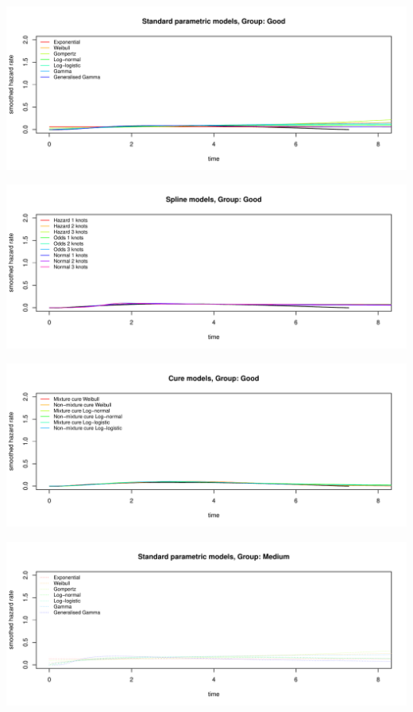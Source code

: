 \documentclass[
]{article}
\begin{document}
\begin{flushleft}\includegraphics[height=0.29\textheight]{BC_OS_output/Images/Figure_plot_haz_pred-1} \end{flushleft}

\begin{flushleft}\includegraphics[height=0.29\textheight]{BC_OS_output/Images/Figure_plot_haz_pred-2} \end{flushleft}

\begin{flushleft}\includegraphics[height=0.29\textheight]{BC_OS_output/Images/Figure_plot_haz_pred-3} \end{flushleft}

\begin{flushleft}\includegraphics[height=0.29\textheight]{BC_OS_output/Images/Figure_plot_haz_pred-4} \end{flushleft}
\end{document}
